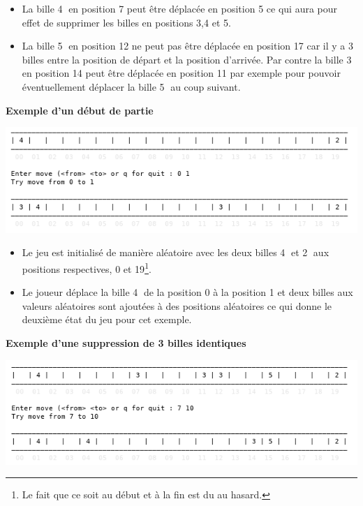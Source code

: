 \documentclass[a4paper,11pt]{style-esi/td}
\begin{document}
\begin{itemize}

	\item La bille \textcircled{\tiny 4} en position 7 peut être déplacée en
		position 5 ce qui aura pour effet de supprimer les billes en positions
		3,4 et 5. 

	\item La bille \textcircled{\tiny 5} en position 12 ne peut pas être
		déplacée en position 17 car il y a 3 billes entre la position de départ
		et la position d'arrivée. Par contre la bille \textcircled{\tiny 3} en
		position 14 peut être déplacée en position 11 par exemple pour pouvoir 
		éventuellement déplacer la bille \textcircled{\tiny 5} au coup suivant. 

\end{itemize}

\textbf{Exemple d'un début de partie}

\includegraphics[width=.9\linewidth]{img/out-1.png}

\begin{itemize}

	\item Le jeu est initialisé de manière aléatoire avec les deux billes
		\textcircled{\tiny 4} et \textcircled{\tiny 2} aux positions
		respectives, 0 et 19\footnote{Le fait que ce soit au début et à la fin
		est du au hasard.}.

	\item Le joueur déplace la bille \textcircled{\tiny 4} de la position
		0 à la position 1 et deux billes aux valeurs aléatoires sont ajoutées
		à des positions aléatoires ce qui donne le deuxième état du jeu pour cet 
		exemple.

\end{itemize}

\clearpage
\textbf{Exemple d'une suppression de 3 billes identiques}

\includegraphics[width=.9\linewidth]{img/out-2.png}
\end{document}
